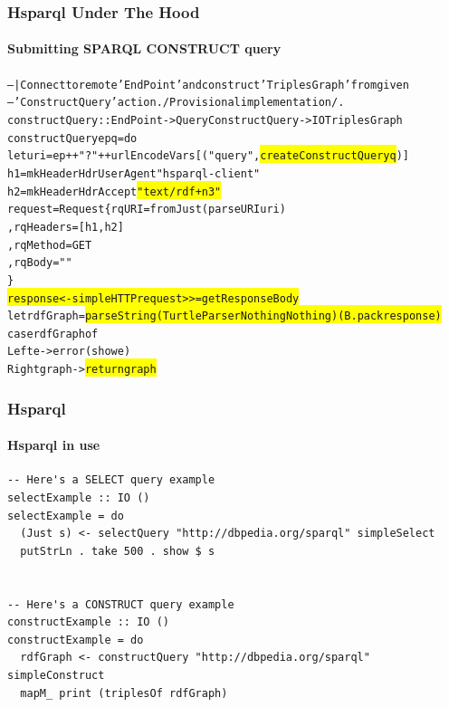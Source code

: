 \documentclass{beamer}
\newcommand{\hilightyellow}[1]{\colorbox{yellow}{#1}}
\begin{document}
\begin{frame}[fragile]
\frametitle{Hsparql Under The Hood}
\framesubtitle{Submitting SPARQL CONSTRUCT query}

\scriptsize
\begin{alltt}
-- |Connect to remote 'EndPoint' and construct 'TriplesGraph' from given
--  'ConstructQuery' action. /Provisional implementation/.
constructQuery :: EndPoint -> Query ConstructQuery -> IO TriplesGraph
constructQuery ep q = do
    let uri      = ep ++ "?" ++ urlEncodeVars [("query", \hilightyellow{createConstructQuery q})]
        h1 = mkHeader HdrUserAgent "hsparql-client"
        h2 = mkHeader HdrAccept \hilightyellow{"text/rdf+n3"}
        request = Request \{ rqURI = fromJust (parseURI uri)
                          , rqHeaders = [h1,h2]
                          , rqMethod = GET
                          , rqBody = ""
                          \}
    \hilightyellow{response <- simpleHTTP request >>= getResponseBody}
    let rdfGraph = \hilightyellow{parseString (TurtleParser Nothing Nothing) (B.pack response)}
    case rdfGraph of
     Left e -> error (show e)
     Right graph -> \hilightyellow{return graph}
\end{alltt}

\end{frame}


\begin{frame}[fragile]
\frametitle{Hsparql}
\framesubtitle{Hsparql in use}

\scriptsize
\begin{verbatim}
-- Here's a SELECT query example
selectExample :: IO ()
selectExample = do
  (Just s) <- selectQuery "http://dbpedia.org/sparql" simpleSelect
  putStrLn . take 500 . show $ s


-- Here's a CONSTRUCT query example
constructExample :: IO ()
constructExample = do
  rdfGraph <- constructQuery "http://dbpedia.org/sparql" simpleConstruct
  mapM_ print (triplesOf rdfGraph)
\end{verbatim}

\end{frame}
\end{document}
